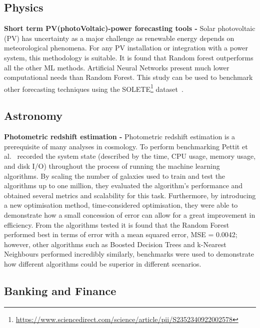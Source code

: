 \documentclass[a4paper,UKenglish,cleveref, autoref, thm-restate]{lipics-v2021}
\begin{document}
\subsection{Physics}
\label{physics}

 \textbf{Short term PV(photoVoltaic)-power forecasting tools -}
Solar photovoltaic (PV) has uncertainty as a major challenge as renewable energy depends on meteorological phenomena.
 For any PV installation or integration with a power system, this methodology is suitable. It is found that Random forest outperforms all the other ML methods. Artificial Neural Networks present much lower computational needs than Random Forest. This study can be used to benchmark other forecasting techniques using the SOLETE\footnote{\url{https://www.sciencedirect.com/science/article/pii/S2352340922002578}} dataset~\cite{pv}.



\subsection{Astronomy}
\label{Astronomy}
\textbf{Photometric redshift estimation -}
Photometric redshift estimation is a prerequisite of many analyses in cosmology. To perform benchmarking Pettit et al.~\cite{redshift} recorded the system
state (described by the time, CPU usage, memory usage, and disk
I/O) throughout the process of running the machine learning algorithms.
By scaling the number of galaxies used to train and test the algorithms up to one million, they evaluated the algorithm's performance and obtained several metrics and scalability for this task. Furthermore, by introducing a new optimisation method, time-considered optimisation, they were able to demonstrate how a small concession of error can allow for a great improvement in efficiency. From the algorithms tested it is found that the Random Forest performed best in terms of error with a mean squared error, MSE = 0.0042; however, other algorithms such as Boosted Decision Trees and k-Nearest Neighbours performed incredibly similarly, benchmarks were used to demonstrate how different algorithms could be superior in different scenarios.
\subsection{Banking and Finance}
\label{Banking and Finance}
\end{document}
